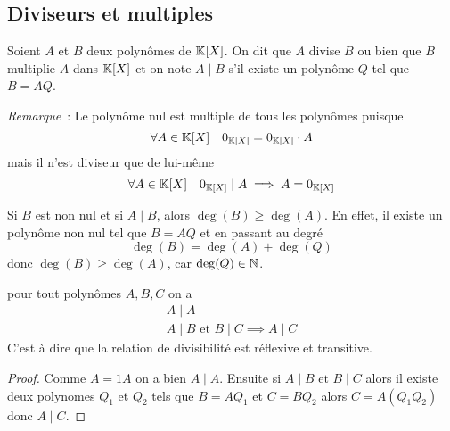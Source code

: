 \subsection{Diviseurs et multiples}

\begin{defdef}
  Soient \(A\) et \(B\) deux polynômes de \(\mathbb{K}[X]\). On dit que \(A\) divise 
  \(B\) ou bien que \(B\) multiplie \(A\) dans \(\mathbb{K}[X]\) et on note \(A\mid{}B\) 
  s'il existe un polynôme \(Q\) tel que \(B=AQ\).
\end{defdef}

\emph{Remarque}~: Le polynôme nul est multiple de tous les polynômes puisque
\begin{equation}
  \forall A \in \mathbb{K}[X] \quad 0_{\mathbb{K}[X]} = 0_{\mathbb{K}[X]} \cdot A
\end{equation}
mais il n'est diviseur que de lui-même
\begin{equation}
  \forall A \in \mathbb{K}[X] \quad 0_{\mathbb{K}[X]}\mid{}A \implies A=0_{\mathbb{K}[X]}
\end{equation}

Si \(B\) est non nul et si \(A\mid{}B\), alors \(\deg(B) \geqslant \deg(A)\). En 
effet, il existe un polynôme non nul tel que \(B=AQ\) et en passant au degré
\begin{equation}
  \deg(B) = \deg(A)+\deg(Q)
\end{equation}
donc \(\deg(B) \geqslant \deg(A)\), car \(\deg(Q)\in \mathbb{N}\).

\begin{prop}
  pour tout polynômes \(A,B,C\) on a
  \begin{align}
    A\mid{}A \\
    A\mid{}B \text{~et~} B\mid{}C \implies A\mid{}C
  \end{align}
  C'est à dire que la relation de divisibilité est réflexive et transitive.
\end{prop}
\begin{proof}
  Comme \(A=1 A\) on a bien \(A\mid{}A\). Ensuite si \(A\mid{}B \text{~et~} 
  B\mid{}C\) alors il existe deux polynomes \(Q_1\) et \(Q_2\) tels que 
  \(B=AQ_1\) et \(C=BQ_2\) alors \(C=A(Q_1Q_2)\) donc \(A\mid{}C\).
\end{proof}

